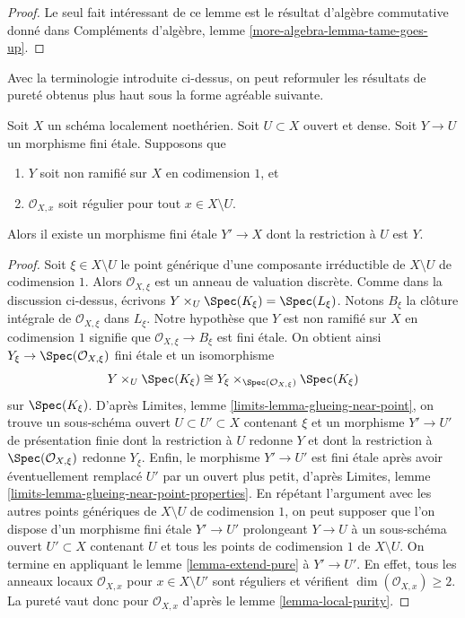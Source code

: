 \begin{proof}
Le seul fait intéressant de ce lemme est le résultat d'algèbre commutative
donné dans Compléments d'algèbre, lemme \ref{more-algebra-lemma-tame-goes-up}.
\end{proof}

\noindent
Avec la terminologie introduite ci-dessus, on peut reformuler les
résultats de pureté obtenus plus haut sous la forme agréable suivante.

\begin{lemma}
\label{lemma-purity-one-divisor-general}
Soit $X$ un schéma localement noethérien. Soit $U \subset X$ ouvert et dense.
Soit $Y \to U$ un morphisme fini \'etale. Supposons que
\begin{enumerate}
\item $Y$ soit non ramifié sur $X$ en codimension $1$, et
\item $\mathcal{O}_{X, x}$ soit régulier pour tout $x \in X \setminus U$.
\end{enumerate}
Alors il existe un morphisme fini \'etale $Y' \to X$
dont la restriction à $U$ est $Y$.
\end{lemma}

\begin{proof}
Soit $\xi \in X \setminus U$ le point générique d'une composante irréductible
de $X \setminus U$ de codimension $1$. Alors $\mathcal{O}_{X, \xi}$ est un
anneau de valuation discrète. Comme dans la discussion ci-dessus, écrivons
$Y \times_U \Spec(K_\xi) = \Spec(L_\xi)$.
Notons $B_\xi$ la clôture intégrale de $\mathcal{O}_{X, \xi}$ dans
$L_\xi$. Notre hypothèse que $Y$ est non ramifié sur $X$ en codimension $1$
signifie que $\mathcal{O}_{X, \xi} \to B_\xi$ est fini \'etale.
On obtient ainsi $Y_\xi \to \Spec(\mathcal{O}_{X, \xi})$ fini
\'etale et un isomorphisme
$$
Y \times_U \Spec(K_\xi) \cong
Y_\xi \times_{\Spec(\mathcal{O}_{X, \xi})} \Spec(K_\xi)
$$
sur $\Spec(K_\xi)$.
D'après Limites, lemme \ref{limits-lemma-glueing-near-point},
on trouve un sous-schéma ouvert $U \subset U' \subset X$
contenant $\xi$ et un morphisme $Y' \to U'$ de présentation finie
dont la restriction à $U$ redonne $Y$ et
dont la restriction à $\Spec(\mathcal{O}_{X, \xi})$ redonne $Y_\xi$.
Enfin, le morphisme $Y' \to U'$ est fini \'etale
après avoir éventuellement remplacé $U'$ par un ouvert plus petit, d'après
Limites, lemme \ref{limits-lemma-glueing-near-point-properties}.
En répétant l'argument avec les autres points génériques de
$X \setminus U$ de codimension $1$, on peut supposer que l'on dispose
d'un morphisme fini \'etale $Y' \to U'$ prolongeant $Y \to U$
à un sous-schéma ouvert $U' \subset X$ contenant $U$
et tous les points de codimension $1$ de $X \setminus U$.
On termine en appliquant le lemme \ref{lemma-extend-pure}
à $Y' \to U'$. En effet, tous les anneaux locaux $\mathcal{O}_{X, x}$
pour $x \in X \setminus U'$ sont réguliers et
vérifient $\dim(\mathcal{O}_{X, x}) \geq 2$. La pureté vaut donc
pour $\mathcal{O}_{X, x}$ d'après le lemme \ref{lemma-local-purity}.
\end{proof}

